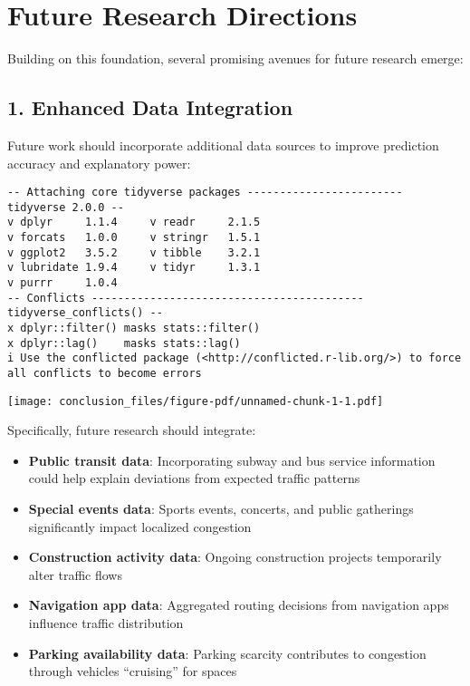 \documentclass[
  letterpaper,
  DIV=11,
  numbers=noendperiod]{scrreprt}
\providecommand{\tightlist}{%
  \setlength{\itemsep}{0pt}\setlength{\parskip}{0pt}}\usepackage{longtable,booktabs,array}
\begin{document}
\section{Future Research Directions}\label{future-research-directions}

Building on this foundation, several promising avenues for future
research emerge:

\subsection{1. Enhanced Data
Integration}\label{enhanced-data-integration}

Future work should incorporate additional data sources to improve
prediction accuracy and explanatory power:

\begin{verbatim}
-- Attaching core tidyverse packages ------------------------ tidyverse 2.0.0 --
v dplyr     1.1.4     v readr     2.1.5
v forcats   1.0.0     v stringr   1.5.1
v ggplot2   3.5.2     v tibble    3.2.1
v lubridate 1.9.4     v tidyr     1.3.1
v purrr     1.0.4     
-- Conflicts ------------------------------------------ tidyverse_conflicts() --
x dplyr::filter() masks stats::filter()
x dplyr::lag()    masks stats::lag()
i Use the conflicted package (<http://conflicted.r-lib.org/>) to force all conflicts to become errors
\end{verbatim}

\begin{center}
\texttt{[image: conclusion\_files/figure-pdf/unnamed-chunk-1-1.pdf]}
\end{center}

Specifically, future research should integrate:

\begin{itemize}
\tightlist
\item
  \textbf{Public transit data}: Incorporating subway and bus service
  information could help explain deviations from expected traffic
  patterns
\item
  \textbf{Special events data}: Sports events, concerts, and public
  gatherings significantly impact localized congestion
\item
  \textbf{Construction activity data}: Ongoing construction projects
  temporarily alter traffic flows
\item
  \textbf{Navigation app data}: Aggregated routing decisions from
  navigation apps influence traffic distribution
\item
  \textbf{Parking availability data}: Parking scarcity contributes to
  congestion through vehicles ``cruising'' for spaces
\end{itemize}
\end{document}
